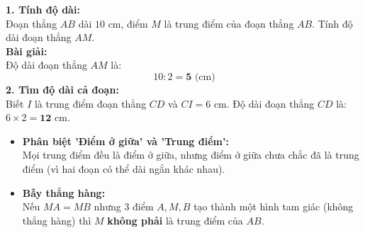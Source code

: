 \documentclass[12pt,a4paper]{article}
\begin{document}
\vspace{-2.5mm}
\noindent
\begin{minipage}[t]{0.49\textwidth}\vspace{0pt}
\begin{tcolorbox}[
  enhanced,
  colback=green!4!white,
  colframe=green!60!black,
  arc=2mm, boxrule=0.8pt,
  left=2mm, right=2mm, top=1.8mm, bottom=1.8mm,
  title={\footnotesize\bfseries\color{white}\faCheckCircle\ Ví dụ thực hành chuẩn mực}
]
{\footnotesize
\textbf{1. Tính độ dài:}\\
Đoạn thẳng $AB$ dài $10\text{ cm}$, điểm $M$ là trung điểm của đoạn thẳng $AB$. Tính độ dài đoạn thẳng $AM$.\\
\textbf{Bài giải:}\\
Độ dài đoạn thẳng $AM$ là:
$$10 : 2 = \mathbf{5}\text{ (cm)}$$
\textbf{2. Tìm độ dài cả đoạn:}\\
Biết $I$ là trung điểm đoạn thẳng $CD$ và $CI = 6\text{ cm}$. Độ dài đoạn thẳng $CD$ là: $6 \times 2 = \mathbf{12}\text{ cm}$.
}
\end{tcolorbox}
\end{minipage}
\hfill
\begin{minipage}[t]{0.49\textwidth}\vspace{0pt}
\begin{tcolorbox}[
  enhanced,
  colback=red!4!white,
  colframe=red!70!black,
  arc=2mm, boxrule=0.8pt,
  left=2mm, right=2mm, top=1.8mm, bottom=1.8mm,
  title={\footnotesize\bfseries\color{white}\faExclamationTriangle\ Mẹo tránh bẫy trắc nghiệm}
]
{\footnotesize
\begin{itemize}\setlength{\itemsep}{1.5pt}\setlength{\leftskip}{-2.5mm}
  \item \textbf{Phân biệt 'Điểm ở giữa' và 'Trung điểm':}\\
  Mọi trung điểm đều là điểm ở giữa, nhưng điểm ở giữa chưa chắc đã là trung điểm (vì hai đoạn có thể dài ngắn khác nhau).
  \item \textbf{Bẫy thẳng hàng:}\\
  Nếu $MA = MB$ nhưng 3 điểm $A, M, B$ tạo thành một hình tam giác (không thẳng hàng) thì $M$ \textbf{không phải} là trung điểm của $AB$.
\end{itemize}
}
\end{tcolorbox}
\end{minipage}
\end{document}
